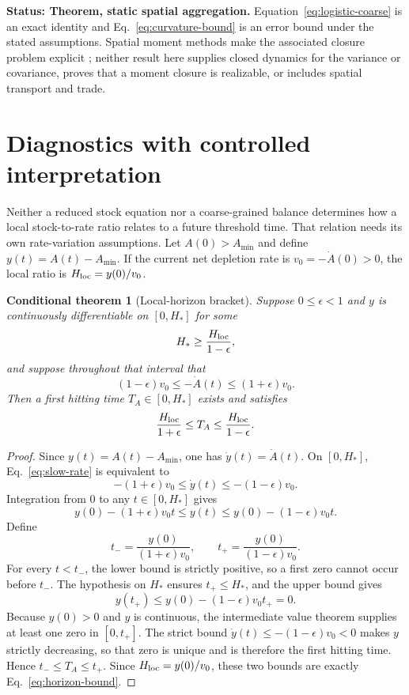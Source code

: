\documentclass[11pt]{article}
\newtheorem{conditionaltheorem}{Conditional theorem}
\theoremstyle{definition}
\newcommand{\status}[1]{\par\smallskip\noindent\textbf{Status: #1.}\quad}
\begin{document}
\status{Theorem, static spatial aggregation} Equation~\eqref{eq:logistic-coarse} is an exact identity and Eq.~\eqref{eq:curvature-bound} is an error bound under the stated assumptions. Spatial moment methods make the associated closure problem explicit \cite{bolker1997,murrell2004}; neither result here supplies closed dynamics for the variance or covariance, proves that a moment closure is realizable, or includes spatial transport and trade.

\section{Diagnostics with controlled interpretation}

Neither a reduced stock equation nor a coarse-grained balance determines how a local stock-to-rate ratio relates to a future threshold time. That relation needs its own rate-variation assumptions. Let $A(0)>A_{\min}$ and define $y(t)=A(t)-A_{\min}$. If the current net depletion rate is $v_0=-\dot A(0)>0$, the local ratio is $H_{\rm loc}=y(0)/v_0$.

\begin{conditionaltheorem}[Local-horizon bracket]
\label{thm:horizon}
Suppose $0\le\epsilon<1$ and $y$ is continuously differentiable on $[0,H_*]$ for some
\[
H_*\ge\frac{H_{\rm loc}}{1-\epsilon},
\]
and suppose throughout that interval that
\begin{equation}
(1-\epsilon)v_0\le-\dot A(t)\le(1+\epsilon)v_0.
\label{eq:slow-rate}
\end{equation}
Then a first hitting time $T_A\in[0,H_*]$ exists and satisfies
\begin{equation}
\frac{H_{\rm loc}}{1+\epsilon}
\le T_A\le
\frac{H_{\rm loc}}{1-\epsilon}.
\label{eq:horizon-bound}
\end{equation}
\end{conditionaltheorem}

\begin{proof}
Since $y(t)=A(t)-A_{\min}$, one has $\dot y(t)=\dot A(t)$. On $[0,H_*]$, Eq.~\eqref{eq:slow-rate} is equivalent to
\[
-(1+\epsilon)v_0\le\dot y(t)\le-(1-\epsilon)v_0.
\]
Integration from $0$ to any $t\in[0,H_*]$ gives
\[
y(0)-(1+\epsilon)v_0t
\le y(t)
\le y(0)-(1-\epsilon)v_0t.
\]
Define
\[
t_- =\frac{y(0)}{(1+\epsilon)v_0},
\qquad
t_+ =\frac{y(0)}{(1-\epsilon)v_0}.
\]
For every $t<t_-$, the lower bound is strictly positive, so a first zero cannot occur before $t_-$. The hypothesis on $H_*$ ensures $t_+\le H_*$, and the upper bound gives
\[
y(t_+)\le y(0)-(1-\epsilon)v_0t_+=0.
\]
Because $y(0)>0$ and $y$ is continuous, the intermediate value theorem supplies at least one zero in $[0,t_+]$. The strict bound $\dot y(t)\le-(1-\epsilon)v_0<0$ makes $y$ strictly decreasing, so that zero is unique and is therefore the first hitting time. Hence $t_-\le T_A\le t_+$. Since $H_{\rm loc}=y(0)/v_0$, these two bounds are exactly Eq.~\eqref{eq:horizon-bound}.
\end{proof}
\end{document}
